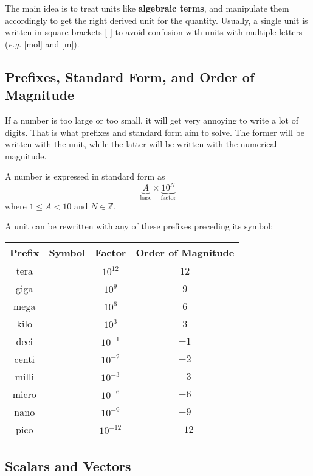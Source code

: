 \documentclass[../main.tex]{subfiles}
\begin{document}
			The main idea is to treat units like \textbf{algebraic terms}, and manipulate them accordingly to get the right derived unit for the quantity. Usually, a single unit is written in square brackets [ ] to avoid confusion with units with multiple letters (\textit{e.g.} [\si{\mole}] and [\si{\meter}]).
			
		\subsection{Prefixes, Standard Form, and Order of Magnitude}
		If a number is too large or too small, it will get very annoying to write a lot of digits. That is what prefixes and standard form aim to solve. The former will be written with the unit, while the latter will be written with the numerical magnitude.
		
		A number is expressed in standard form as
		\[ 
			\underbrace{A}_{\text{base}} \times \underbrace{10^N}_{\text{factor}} 
		\]
		where \(1 \leqslant A < 10\) and \(N \in \mathbb{Z}\).
		
		A unit can be rewritten with any of these prefixes preceding its symbol:
		\begin{center}
		\begin{tabular}{cccc}
			\hline \hline
			Prefix & Symbol & Factor & Order of Magnitude \\  
			\hline
			tera & \si{\tera} & \(10^{12}\) & 12 \\  
			giga & \si{\giga} & \(10^9\) & 9 \\  
			mega & \si{\mega} & \(10^6\) & 6 \\  
			kilo & \si{\kilo} & \(10^3\) & 3 \\  
			deci & \si{\deci} & \(10^{-1}\) & \(-1\) \\  
			centi & \si{\centi} & \(10^{-2}\) & \(-2\) \\  
			milli & \si{\milli} & \(10^{-3}\) & \(-3\) \\  
			micro & \si{\micro} & \(10^{-6}\) & \(-6\) \\  
			nano & \si{\nano} & \(10^{-9}\) & \(-9\) \\  
			pico & \si{\pico} & \(10^{-12}\) & \(-12\) \\ 
			\hline \hline
		\end{tabular} 
		\end{center}
	
		\subsection{Scalars and Vectors}
		
\end{document}
